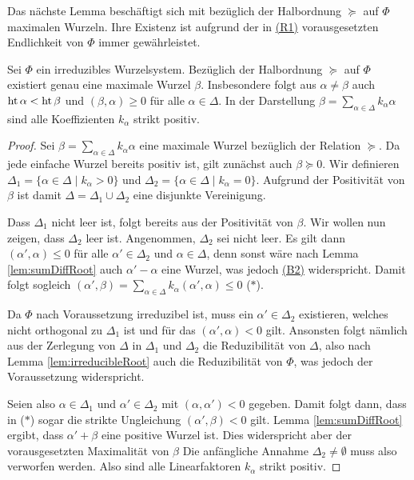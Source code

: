 Das nächste Lemma beschäftigt sich mit bezüglich der Halbordnung $\succeq$ auf $\Phi$ maximalen Wurzeln. 
Ihre Existenz ist aufgrund der in \hyperref[it:R1]{(R1)} vorausgesetzten Endlichkeit von $\Phi$ immer gewährleistet. 

\begin{lem}
  \label{lem:maximalRoot}
  Sei $\Phi$ ein irreduzibles Wurzelsystem.
  Bezüglich der Halbordnung $\succeq$ auf $\Phi$ existiert genau eine maximale Wurzel $\beta$.
  Insbesondere folgt aus $\alpha \neq \beta$ auch $\operatorname{ht} \alpha < \operatorname{ht} \beta$ und $(\beta, \alpha) \geq 0$ für alle $\alpha \in \Delta$.
  In der Darstellung $\beta = \sum_{\alpha \in \Delta} k_\alpha \alpha$ sind alle Koeffizienten $k_\alpha$ strikt positiv.
\end{lem}

\begin{proof}
  Sei $\beta = \sum_{\alpha \in \Delta} k_\alpha \alpha$ eine maximale Wurzel bezüglich der Relation $\succeq$.
  Da jede einfache Wurzel bereits positiv ist, gilt zunächst auch $\beta \succeq 0$.
  Wir definieren $\Delta_1 = \{\alpha \in \Delta \mid k_\alpha > 0\}$ und $\Delta_2 = \{\alpha \in \Delta \mid k_\alpha = 0\}$.
  Aufgrund der Positivität von $\beta$ ist damit $\Delta = \Delta_1 \cup \Delta_2$ eine disjunkte Vereinigung.

  Dass $\Delta_1$ nicht leer ist, folgt bereits aus der Positivität von $\beta$.
  Wir wollen nun zeigen, dass $\Delta_2$ leer ist.
  Angenommen, $\Delta_2$ sei nicht leer.
  Es gilt dann $(\alpha', \alpha) \leq 0$ für alle $\alpha' \in \Delta_2$ und $\alpha \in \Delta$, denn sonst wäre nach Lemma \ref{lem:sumDiffRoot} auch $\alpha' - \alpha$ eine Wurzel, was jedoch \hyperref[it:B2]{(B2)} widerspricht.
  Damit folgt sogleich $(\alpha', \beta) = \sum_{\alpha \in \Delta} k_\alpha (\alpha', \alpha) \leq 0 $ ($\ast$).

  Da $\Phi$ nach Voraussetzung irreduzibel ist, muss ein $\alpha' \in \Delta_2$ existieren, welches nicht orthogonal zu $\Delta_1$ ist und für das $(\alpha', \alpha) < 0$ gilt.
  Ansonsten folgt nämlich aus der Zerlegung von $\Delta$ in $\Delta_1$ und $\Delta_2$ die Reduzibilität von $\Delta$, also nach Lemma \ref{lem:irreducibleRoot} auch die Reduzibilität von $\Phi$, was jedoch der Voraussetzung widerspricht.

  Seien also $\alpha \in \Delta_1$ und $\alpha' \in \Delta_2$ mit $(\alpha, \alpha') < 0$ gegeben.
  Damit folgt dann, dass in ($\ast$) sogar die strikte Ungleichung $(\alpha', \beta) < 0$ gilt.
  Lemma \ref{lem:sumDiffRoot} ergibt, dass $\alpha' +  \beta$ eine positive Wurzel ist.
  Dies widerspricht aber der vorausgesetzten Maximalität von $\beta$
  Die anfängliche Annahme $\Delta_2 \neq \emptyset$ muss also verworfen werden.
  Also sind alle Linearfaktoren $k_\alpha$ strikt positiv.


\end{proof}
